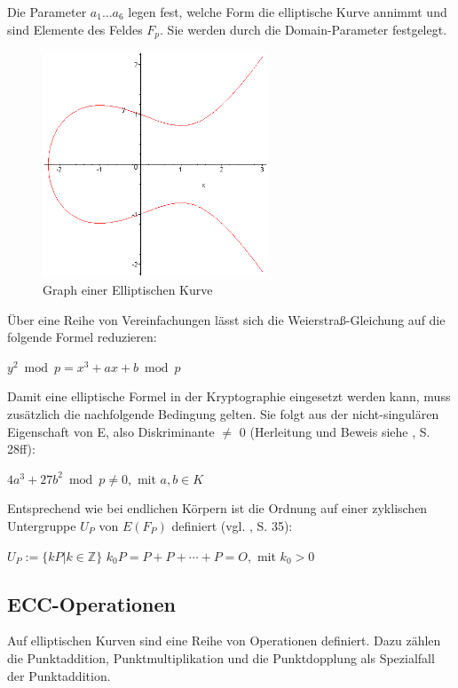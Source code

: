 Die Parameter $a_1 \dots a_6$ legen fest, welche Form die elliptische Kurve annimmt und sind Elemente des Feldes $F_p$. Sie werden durch die Domain-Parameter festgelegt. 

\begin{figure}[H]
	\centering
   \includegraphics[width=0.60\textwidth]{bilder/ellkurve}
	\caption{Graph einer Elliptischen Kurve}
	\label{fig:ellkurve}
\end{figure}

Über eine Reihe von Vereinfachungen lässt sich die Weierstraß-Gleichung auf die folgende Formel reduzieren:  %
\begin{center}
$ y^2 \bmod p = x^3 + a x + b \bmod p $
\end{center}

Damit eine elliptische Formel in der Kryptographie eingesetzt werden kann, muss zusätzlich die nachfolgende Bedingung gelten. Sie folgt aus der nicht-singulären Eigenschaft von E, also Diskriminante $\ne$ 0 (Herleitung und Beweis siehe \cite{grebe}, S. 28ff):
\begin{center}
$ 4 a^3 + 27 b^2 \bmod p \ne 0, $ mit $ a,b \in K $
\end{center}

Entsprechend wie bei endlichen Körpern ist die Ordnung auf einer zyklischen Untergruppe $U_P$ von $E(F_P)$ definiert (vgl. \cite{grebe}, S. 35):
\begin{center}
$ U_P := \{ k P | k \in \mathbb{Z} \}$
$k_0 P = P + P + \cdots + P = O, $ mit $ k_0 > 0$
\end{center}

\subsection{ECC-Operationen}
Auf elliptischen Kurven sind eine Reihe von Operationen definiert. Dazu zählen die Punktaddition, Punktmultiplikation und die Punktdopplung als Spezialfall der Punktaddition.

